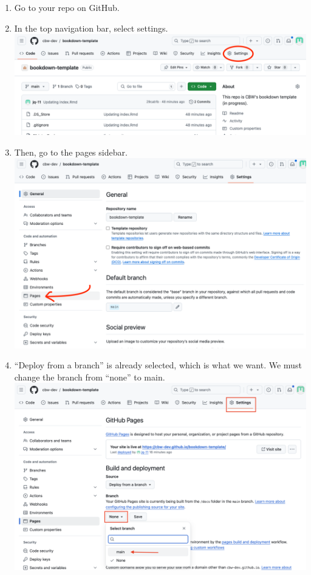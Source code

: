 \documentclass[
]{book}
\theoremstyle{definition}
\theoremstyle{definition}
\theoremstyle{definition}
\theoremstyle{definition}
\theoremstyle{remark}
\begin{document}
\begin{enumerate}
\def\labelenumi{\arabic{enumi}.}
\item
  Go to your repo on GitHub.
\item
  In the top navigation bar, select settings.
  \includegraphics{img/git-instruct/github-settings.png}
\item
  Then, go to the pages sidebar.
  \includegraphics{img/git-instruct/github-select-pages.png}
\item
  ``Deploy from a branch'' is already selected, which is what we want. We must change the branch from ``none'' to main.
  \includegraphics{img/git-instruct/github-deploy-main.png}

\end{enumerate}
\end{document}
